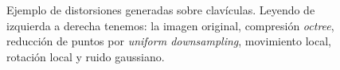\begin{figure}[htp]
\begin{subfigure}[b]{.5\textwidth}
  \end{subfigure}
  \caption[Ejemplo de distorsiones generadas sobre clavículas.]{Ejemplo de distorsiones generadas sobre clavículas. Leyendo de izquierda a derecha tenemos:
    la imagen original, compresión \emph{octree}, reducción de puntos por \emph{uniform downsampling},
    movimiento local, rotación local y ruido gaussiano.
  }
  \label{fig:DistorsionesGeneradas}
\end{figure}


